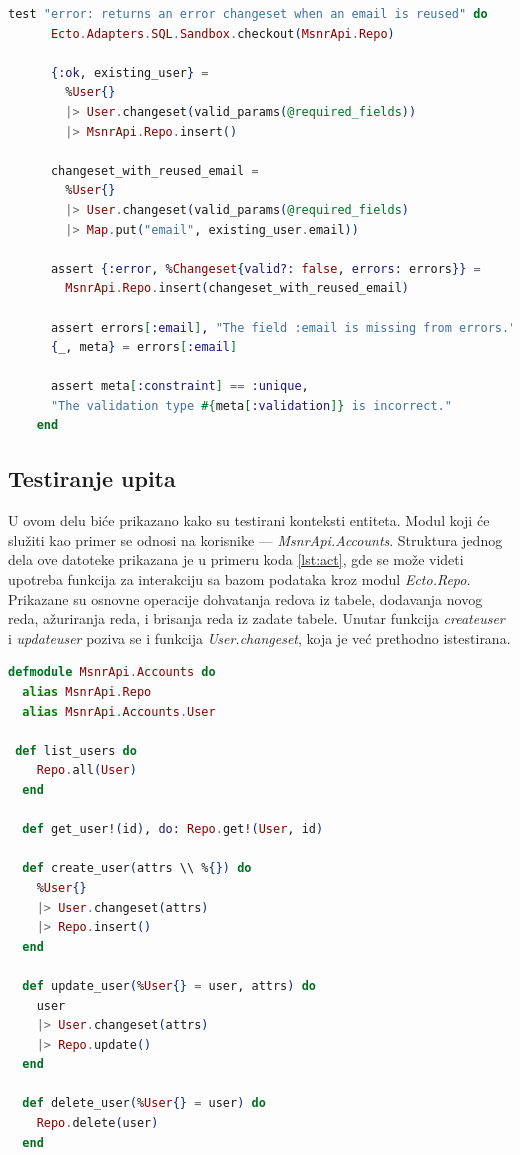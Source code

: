 \documentclass[12pt,oneside]{memoir}
\begin{document}
\begin{lstlisting}[language=elixir, caption={Test slučaj neuspešne upotrebe funkcije \emph{changeset/2}, pri narušavanju ograničenja jedinstvenosti},captionpos=b, label={lst:uniq}]
test "error: returns an error changeset when an email is reused" do
      Ecto.Adapters.SQL.Sandbox.checkout(MsnrApi.Repo)

      {:ok, existing_user} =
        %User{}
        |> User.changeset(valid_params(@required_fields))
        |> MsnrApi.Repo.insert()
        
      changeset_with_reused_email =
        %User{}
        |> User.changeset(valid_params(@required_fields)
        |> Map.put("email", existing_user.email))

      assert {:error, %Changeset{valid?: false, errors: errors}} =
        MsnrApi.Repo.insert(changeset_with_reused_email)

      assert errors[:email], "The field :email is missing from errors."
      {_, meta} = errors[:email]

      assert meta[:constraint] == :unique,
      "The validation type #{meta[:validation]} is incorrect."
    end
\end{lstlisting}

\subsection{Testiranje upita}
\par U ovom delu biće prikazano kako su testirani konteksti entiteta. Modul koji će služiti kao primer se odnosi na korisnike --- \emph{MsnrApi.Accounts}. Struktura jednog dela ove datoteke prikazana je u primeru koda \ref{lst:act}, gde se može videti upotreba funkcija za interakciju sa bazom podataka kroz modul \emph{Ecto.Repo}. Prikazane su osnovne operacije dohvatanja redova iz tabele, dodavanja novog reda, ažuriranja reda, i brisanja reda iz zadate tabele. Unutar funkcija \emph{create{\textunderscore}user} i \emph{update{\textunderscore}user} poziva se i funkcija \emph{User.changeset}, koja je već prethodno istestirana.  

\begin{lstlisting}[language=elixir, caption={Definicija modula \emph{MsnrApi.Accounts}},captionpos=b, label={lst:act}]
defmodule MsnrApi.Accounts do
  alias MsnrApi.Repo
  alias MsnrApi.Accounts.User

 def list_users do
    Repo.all(User)
  end
  
  def get_user!(id), do: Repo.get!(User, id)

  def create_user(attrs \\ %{}) do
    %User{}
    |> User.changeset(attrs)
    |> Repo.insert()
  end

  def update_user(%User{} = user, attrs) do
    user
    |> User.changeset(attrs)
    |> Repo.update()
  end

  def delete_user(%User{} = user) do
    Repo.delete(user)
  end
\end{lstlisting}
\end{document}
